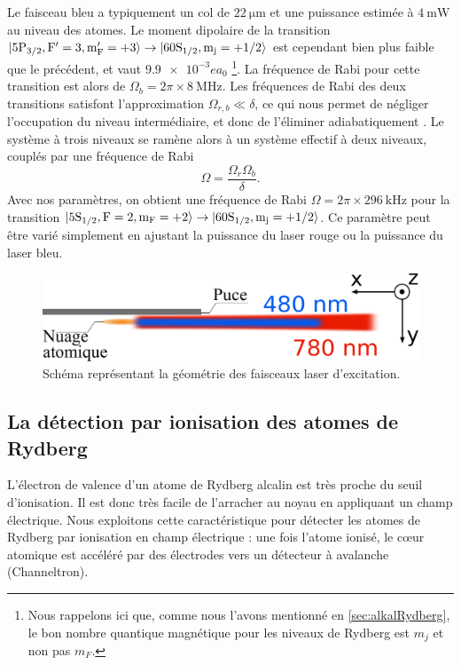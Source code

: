 Le faisceau bleu a typiquement un col de $\SI{22}{\um}$ et une puissance estimée à $\SI{4}{\milli\watt}$ au niveau des atomes.
Le moment dipolaire de la transition $ \ket{\mathrm{5P_{3/2},F'=3,m_F'=+3}} \rightarrow \ket{\mathrm{60S_{1/2},m_j=+1/2}}$ est cependant bien plus faible que le précédent, et vaut $\SI{9.9e-3} ea_0$
\footnote{Nous rappelons ici que, comme nous l'avons mentionné en \ref{sec:alkalRydberg}, le bon nombre quantique magnétique pour les niveaux de Rydberg est $m_j$ et non pas $m_F$.}.
La fréquence de Rabi pour cette transition est alors de $\Omega_b = 2\pi\times \SI{8}{\MHz}$.
Les fréquences de Rabi des deux transitions satisfont l'approximation $\Omega_{r,b} \ll \delta$, ce qui nous permet de négliger l'occupation du niveau intermédiaire, et donc de l'éliminer adiabatiquement \cite{TXT_ASPECTFABRE_QUANTOPT}.
Le système à trois niveaux se ramène alors à un système effectif à deux niveaux, couplés par une fréquence de Rabi
\begin{equation}
\label{eq:Rabi_2photons}
\Omega = \frac{\Omega_r \Omega_b}{\delta}.
\end{equation}
Avec nos paramètres, on obtient une fréquence de Rabi $\Omega = 2\pi \times \SI{296}{\kHz}$ pour la transition $\ket{\mathrm{5S_{1/2},F=2,m_F=+2}} \rightarrow \ket{\mathrm{60S_{1/2},m_j=+1/2}}$.
Ce paramètre peut être varié simplement en ajustant la puissance du laser rouge ou la puissance du laser bleu.

%
\begin{figure}[!h]
\centering
\includegraphics[width=.6\linewidth]{figures/setup/rydberg/lasers_excit}
\caption[Faisceaux laser pour l'excitation des Rydberg]{Schéma représentant la géométrie des faisceaux laser d'excitation.
}
\label{fig:lasers_excit}
\end{figure}

		
	\subsection{La détection par ionisation des atomes de Rydberg}\label{subsec:detection}
\noindent L'électron de valence d'un atome de Rydberg alcalin est très proche du seuil d'ionisation.
Il est donc très facile de l'arracher au noyau en appliquant un champ électrique.
Nous exploitons cette caractéristique pour détecter les atomes de Rydberg par ionisation en champ électrique :
une fois l'atome ionisé, le c\oe ur atomique est accéléré par des électrodes vers un détecteur à avalanche (Channeltron).


